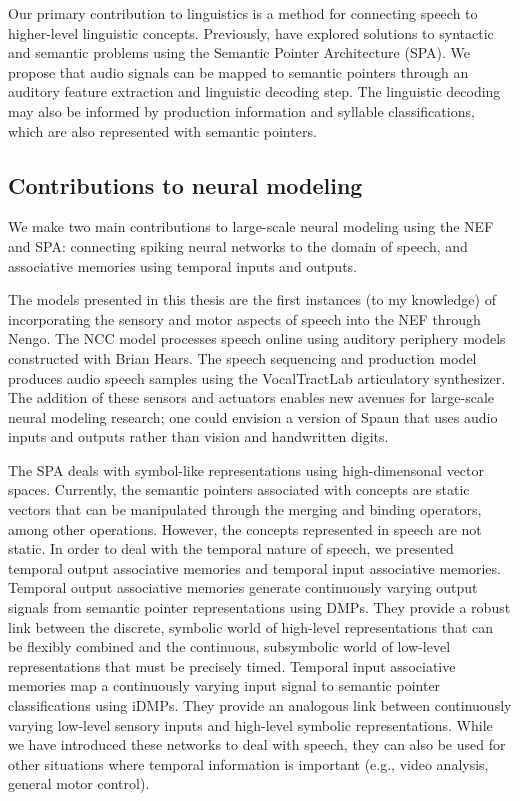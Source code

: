 Our primary contribution to linguistics
is a method for connecting speech
to higher-level linguistic concepts.
Previously, \citet{blouw2013,blouw2015,stewart2015}
have explored solutions to
syntactic and semantic problems
using the Semantic Pointer Architecture (SPA).
We propose that audio signals
can be mapped to semantic pointers
through an auditory feature extraction
and linguistic decoding step.
The linguistic decoding may also be informed
by production information
and syllable classifications,
which are also represented with semantic pointers.

\subsection{Contributions to neural modeling}

We make two main contributions to
large-scale neural modeling using the NEF and SPA:
connecting spiking neural networks
to the domain of speech,
and associative memories using
temporal inputs and outputs.

The models presented in this thesis
are the first instances (to my knowledge)
of incorporating the sensory and motor
aspects of speech into the NEF
through Nengo.
The NCC model processes speech online
using auditory periphery models
constructed with Brian Hears.
The speech sequencing and production model
produces audio speech samples
using the VocalTractLab articulatory synthesizer.
The addition of these sensors and actuators
enables new avenues
for large-scale neural modeling research;
one could envision a version of Spaun
that uses audio inputs and outputs
rather than vision and handwritten digits.

The SPA deals with symbol-like representations
using high-dimensonal vector spaces.
Currently, the semantic pointers
associated with concepts are
static vectors that can be manipulated
through the merging and binding operators,
among other operations.
However, the concepts represented in speech
are not static.
In order to deal with the temporal nature of speech,
we presented temporal output associative memories
and temporal input associative memories.
Temporal output associative memories
generate continuously varying output signals
from semantic pointer representations
using DMPs.
They provide a robust link between the discrete,
symbolic world of high-level representations
that can be flexibly combined
and the continuous, subsymbolic world
of low-level representations that must
be precisely timed.
Temporal input associative memories
map a continuously varying input signal
to semantic pointer classifications
using iDMPs.
They provide an analogous link between
continuously varying low-level sensory inputs
and high-level symbolic representations.
While we have introduced these networks
to deal with speech,
they can also be used for other
situations where temporal information
is important (e.g., video analysis,
general motor control).

